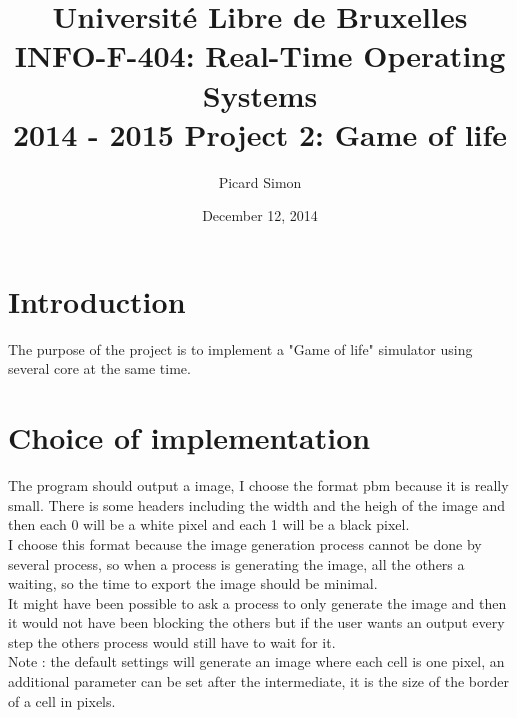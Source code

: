 \documentclass[a4paper,12pt]{article}
\title{Université Libre de Bruxelles\\
INFO-F-404: Real-Time Operating Systems\\
2014 - 2015 Project 2: Game of life}
\author{Picard Simon}
\date{December 12, 2014}
\begin{document}
\maketitle
\clearpage
\tableofcontents
\clearpage

\section{Introduction}
The purpose of the project is to implement a "Game of life" simulator using several core at the same time.
 
\section{Choice of implementation}
The program should output a image, I choose the format pbm because it is really small. There is some headers including the width and the heigh of the image and then each 0 will be a white pixel and each 1 will be a black pixel.\\
I choose this format because the image generation process cannot be done by several process, so when a process is generating the image, all the others a waiting, so the time to export the image should be minimal.\\
It might have been possible to ask a process to only generate the image and then it would not have been blocking the others but if the user wants an output every step the others process would still have to wait for it.\\
Note : the default settings will generate an image where each cell is one pixel, an additional parameter can be set after the intermediate, it is the size of the border of a cell in pixels.
\end{document}
